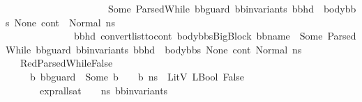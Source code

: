 \begin{isabellebody}
\ \ \ \ \ \ \ \ \ \ \ \ \ \ \ \ \ \ \ \ \ {\isacharparenleft}{\kern0pt}Some\ {\isacharparenleft}{\kern0pt}ParsedWhile\ bb{\isacharunderscore}{\kern0pt}guard\ bb{\isacharunderscore}{\kern0pt}invariants\ {\isacharparenleft}{\kern0pt}bb{\isacharunderscore}{\kern0pt}hd\ {\isacharhash}{\kern0pt}\ body{\isacharunderscore}{\kern0pt}bbs{\isacharparenright}{\kern0pt}{\isacharparenright}{\kern0pt}{\isacharparenright}{\kern0pt}\ None{\isacharparenright}{\kern0pt}{\isacharcomma}{\kern0pt}\ cont{}{\isacharcomma}{\kern0pt}\ \ Normal\ n{\isacharunderscore}{\kern0pt}s{\isacharparenright}{\kern0pt}{\isasymrangle}\ {\isasymlongrightarrow}\ \isanewline
\ \ \ \ \ \ \ \ \ \ \ \ \ \ {\isacharparenleft}{\kern0pt}bb{\isacharunderscore}{\kern0pt}hd{\isacharcomma}{\kern0pt}\ convert{\isacharunderscore}{\kern0pt}list{\isacharunderscore}{\kern0pt}to{\isacharunderscore}{\kern0pt}cont\ {\isacharparenleft}{\kern0pt}{\isacharparenleft}{\kern0pt}body{\isacharunderscore}{\kern0pt}bbs{\isacharparenright}{\kern0pt}{\isacharat}{\kern0pt}{\isacharbrackleft}{\kern0pt}{\isacharparenleft}{\kern0pt}BigBlock\ bb{\isacharunderscore}{\kern0pt}name\ {\isacharbrackleft}{\kern0pt}{\isacharbrackright}{\kern0pt}\ {\isacharparenleft}{\kern0pt}Some\ {\isacharparenleft}{\kern0pt}ParsedWhile\ bb{\isacharunderscore}{\kern0pt}guard\ bb{\isacharunderscore}{\kern0pt}invariants\ {\isacharparenleft}{\kern0pt}bb{\isacharunderscore}{\kern0pt}hd\ {\isacharhash}{\kern0pt}\ body{\isacharunderscore}{\kern0pt}bbs{\isacharparenright}{\kern0pt}{\isacharparenright}{\kern0pt}{\isacharparenright}{\kern0pt}\ None{\isacharparenright}{\kern0pt}{\isacharbrackright}{\kern0pt}{\isacharparenright}{\kern0pt}\ cont{}{\isacharcomma}{\kern0pt}\ Normal\ n{\isacharunderscore}{\kern0pt}s{\isacharparenright}{\kern0pt}{\isachardoublequoteclose}\isanewline
\isanewline
\isanewline
\ \ {\isacharbar}{\kern0pt}\ RedParsedWhileFalse{\isacharcolon}{\kern0pt}\ \isanewline
\ \ \ \ {\isachardoublequoteopen}{\isasymlbrakk}{\isasymAnd}\ b{\isachardot}{\kern0pt}\ bb{\isacharunderscore}{\kern0pt}guard\ {\isacharequal}{\kern0pt}\ {\isacharparenleft}{\kern0pt}Some\ b{\isacharparenright}{\kern0pt}\ {\isasymLongrightarrow}\ {\isasymLambda}{\isacharcomma}{\kern0pt}{\isasymGamma}{\isacharcomma}{\kern0pt}{\isasymOmega}\ {\isasymturnstile}\ {\isasymlangle}b{\isacharcomma}{\kern0pt}\ n{\isacharunderscore}{\kern0pt}s{\isasymrangle}\ {\isasymDown}\ LitV\ {\isacharparenleft}{\kern0pt}LBool\ False{\isacharparenright}{\kern0pt}{\isacharsemicolon}{\kern0pt}\isanewline
\ \ \ \ \ \ \ {\isacharparenleft}{\kern0pt}expr{\isacharunderscore}{\kern0pt}all{\isacharunderscore}{\kern0pt}sat\ {\isasymLambda}\ {\isasymGamma}\ {\isasymOmega}\ n{\isacharunderscore}{\kern0pt}s\ bb{\isacharunderscore}{\kern0pt}invariants{\isacharparenright}{\kern0pt}\ {\isasymrbrakk}\ \ \isanewline

\end{isabellebody}
